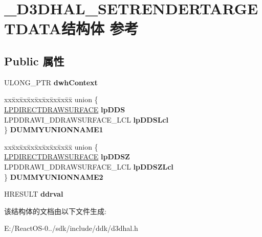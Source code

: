 \hypertarget{struct___d3_d_h_a_l___s_e_t_r_e_n_d_e_r_t_a_r_g_e_t_d_a_t_a}{}\section{\+\_\+\+D3\+D\+H\+A\+L\+\_\+\+S\+E\+T\+R\+E\+N\+D\+E\+R\+T\+A\+R\+G\+E\+T\+D\+A\+T\+A结构体 参考}
\label{struct___d3_d_h_a_l___s_e_t_r_e_n_d_e_r_t_a_r_g_e_t_d_a_t_a}
\subsection*{Public 属性}
\begin{DoxyCompactItemize}
\item 
\mbox{\label{struct___d3_d_h_a_l___s_e_t_r_e_n_d_e_r_t_a_r_g_e_t_d_a_t_a_a34f02ecdb3e30706f36133be74409bef}} 
U\+L\+O\+N\+G\+\_\+\+P\+TR {\bfseries dwh\+Context}
\item 
\mbox{\label{struct___d3_d_h_a_l___s_e_t_r_e_n_d_e_r_t_a_r_g_e_t_d_a_t_a_ae34833b9d945e139c443d89fc75dc55c}} 
\begin{tabbing}
xx\=xx\=xx\=xx\=xx\=xx\=xx\=xx\=xx\=\kill
union \{\\
\>\hyperlink{interfacevoid}{LPDIRECTDRAWSURFACE} {\bfseries lpDDS}\\
\>LPDDRAWI\_DDRAWSURFACE\_LCL {\bfseries lpDDSLcl}\\
\} {\bfseries DUMMYUNIONNAME1}\\

\end{tabbing}\item 
\mbox{\label{struct___d3_d_h_a_l___s_e_t_r_e_n_d_e_r_t_a_r_g_e_t_d_a_t_a_aeec45aaf47967851431c7f0b6424a5d9}} 
\begin{tabbing}
xx\=xx\=xx\=xx\=xx\=xx\=xx\=xx\=xx\=\kill
union \{\\
\>\hyperlink{interfacevoid}{LPDIRECTDRAWSURFACE} {\bfseries lpDDSZ}\\
\>LPDDRAWI\_DDRAWSURFACE\_LCL {\bfseries lpDDSZLcl}\\
\} {\bfseries DUMMYUNIONNAME2}\\

\end{tabbing}\item 
\mbox{\label{struct___d3_d_h_a_l___s_e_t_r_e_n_d_e_r_t_a_r_g_e_t_d_a_t_a_adffda1435db3915f73e7a81918769d46}} 
H\+R\+E\+S\+U\+LT {\bfseries ddrval}
\end{DoxyCompactItemize}


该结构体的文档由以下文件生成\+:\begin{DoxyCompactItemize}
\item 
E\+:/\+React\+O\+S-\/0../sdk/include/ddk/d3dhal.\+h\end{DoxyCompactItemize}
